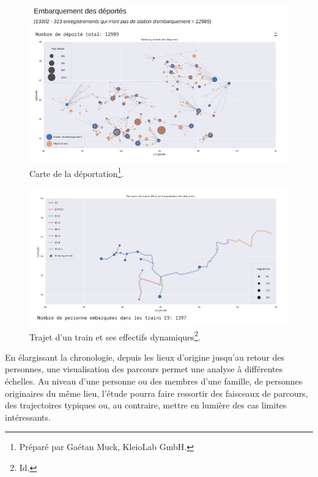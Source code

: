 \documentclass[a4paper,12pt,twoside]{book}
\begin{document}
				    \begin{figure}[!ht]
            			\centering
                        \includegraphics[width=15cm]{images/deportation_map.jpg}
                        \vspace{-0.8cm}
                        \caption[Carte de la déportation.]{Carte de la déportation\footnote{Préparé par Gaétan Muck, KleioLab GmbH.}.}
                        \label{fig21}
                    \end{figure}

				    \begin{figure}[!ht]
            			\centering
                        \includegraphics[width=\textwidth]{images/trains.jpg}
                        \vspace{-1.2cm}
                        \caption[Trajet d'un train.]{Trajet d'un train et ses effectifs dynamiques\footnote{Id.}.}
                        \label{fig22}
                    \end{figure}
                    
                    En élargissant la chronologie, depuis les lieux d'origine jusqu'au retour des personnes, une visualisation des parcours permet une analyse à différentes échelles. Au niveau d’une personne ou des membres d’une famille, de personnes originaires du même lieu, l'étude pourra faire ressortir des faisceaux de parcours, des trajectoires typiques ou, au contraire, mettre en lumière des cas limites intéressants.
				    \pagebreak
\end{document}
